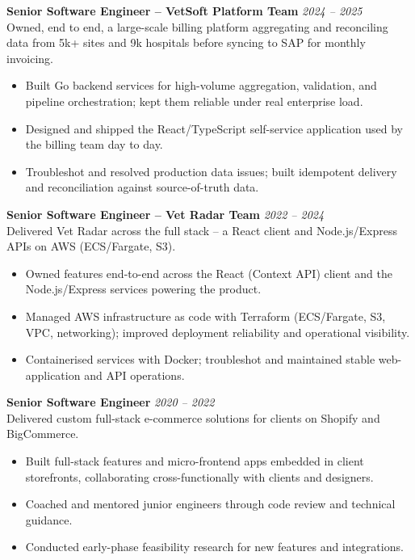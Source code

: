 \documentclass{resume}
\begin{document}
\vspace{1em}

\textbf{Senior Software Engineer -- VetSoft Platform Team} \hfill \textit{2024 -- 2025} \\
Owned, end to end, a large-scale billing platform aggregating and reconciling data from 5k+ sites and 9k hospitals before syncing to SAP for monthly invoicing.
\begin{itemize}
  \item Built Go backend services for high-volume aggregation, validation, and pipeline orchestration; kept them reliable under real enterprise load.
  \item Designed and shipped the React/TypeScript self-service application used by the billing team day to day.
  \item Troubleshot and resolved production data issues; built idempotent delivery and reconciliation against source-of-truth data.
\end{itemize}

\vspace{1em}

\textbf{Senior Software Engineer -- Vet Radar Team} \hfill \textit{2022 -- 2024} \\
Delivered Vet Radar across the full stack -- a React client and Node.js/Express APIs on AWS (ECS/Fargate, S3).
\begin{itemize}
  \item Owned features end-to-end across the React (Context API) client and the Node.js/Express services powering the product.
  \item Managed AWS infrastructure as code with Terraform (ECS/Fargate, S3, VPC, networking); improved deployment reliability and operational visibility.
  \item Containerised services with Docker; troubleshot and maintained stable web-application and API operations.
\end{itemize}

\vspace{1em}

\vspace{1em}
\textbf{Senior Software Engineer} \hfill \textit{2020 -- 2022} \\
Delivered custom full-stack e-commerce solutions for clients on Shopify and BigCommerce.
\begin{itemize}
  \item Built full-stack features and micro-frontend apps embedded in client storefronts, collaborating cross-functionally with clients and designers.
  \item Coached and mentored junior engineers through code review and technical guidance.
  \item Conducted early-phase feasibility research for new features and integrations.
\end{itemize}
\end{document}
